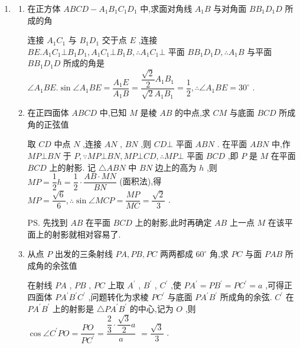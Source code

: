 \begin{enumerate}
\begin{jieda}
        在直角三角形 $\bigtriangleup {B}_{1}{OM}$ 中,易得 $\tan \angle {B}_{1}{OM} = \dfrac{{B}_{1}M}{OM} = \sqrt{2}$,所以 $\angle {B}_{1}{OM} = \arctan \sqrt{2}$. 即直线 ${B}_{1}D$ 与平面 ${AB}{C}_{1}{D}_{1}$ 所成角的大小为  $\arctan\sqrt{2}$.
    \end{jieda}
    \item \begin{enumerate}
        \item 在正方体 ${ABCD} - {A}_{1}{B}_{1}{C}_{1}{D}_{1}$ 中,求面对角线 ${A}_{1}B$ 与对角面 $B{B}_{1}{D}_{1}D$ 所成的角
        \begin{jieda}
            连接 ${A}_{1}{C}_{1}$ 与 ${B}_{1}{D}_{1}$ 交于点 $E$ ,连接 ${BE}.{A}_{1}{C}_{1} \bot  {B}_{1}{D}_{1},{A}_{1}{C}_{1} \bot  {B}_{1}B,\therefore {A}_{1}{C}_{1} \bot$ 平面 $B{B}_{1}{D}_{1}D,\therefore {A}_{1}B$ 与平面 $B{B}_{1}{D}_{1}D$ 所成的角是 $\angle {A}_{1}{BE}.\sin \angle {A}_{1}{BE} = \dfrac{{A}_{1}E}{{A}_{1}B} = \dfrac{\dfrac{\sqrt{2}}{2}{A}_{1}{B}_{1}}{\sqrt{2}{A}_{1}{B}_{1}} = \dfrac{1}{2},\therefore \angle {A}_{1}{BE} = {30}^{ \circ  }$ .
        \end{jieda}
        \item 在正四面体 ${ABCD}$ 中,已知 $M$ 是棱 ${AB}$ 的中点,求 ${CM}$ 与底面 ${BCD}$ 所成角的正弦值
        \begin{jieda}
            取 ${CD}$ 中点 $N$ ,连接 ${AN}$ , ${BN}$ ,则 ${CD} \bot$ 平面 ${ABN}$ . 在平面 ${ABN}$ 中,作 ${MP}\bot {BN}$ 于 $P,\because {MP} \bot  {BN},{MP} \bot  {CD},\therefore {MP} \bot$ 平面 ${BCD}$ ,即 $P$ 是 $M$ 在平面 ${BCD}$ 上的射影. 记 $\bigtriangleup {ABN}$ 中 ${BN}$ 边上的高为 $h$ ,则 ${MP} = \dfrac{1}{2}h = \dfrac{1}{2} \cdot  \dfrac{{AB} \cdot  {MN}}{BN}$ (面积法),得 ${MP} = \dfrac{\sqrt{6}}{6},\therefore \sin \angle {MCP} = \dfrac{MP}{MC} = \dfrac{\sqrt{2}}{3}$ . 
            
            \ps 先找到 ${AB}$ 在平面 ${BCD}$ 上的射影,此时再确定 ${AB}$ 上一点 $M$ 在该平面上的射影就相对容易了.
        \end{jieda}
        \item 从点 $P$ 出发的三条射线 ${PA},{PB},{PC}$ 两两都成 ${60}^{ \circ  }$ 角,求 ${PC}$ 与面 ${PAB}$ 所成角的余弦值
        \begin{jieda}
            在射线 ${PA}$ , ${PB}$ , ${PC}$ 上取 ${A}^{\prime }$ , ${B}^{\prime }$ , ${C}^{\prime }$ ,使 $P{A}^{\prime } = P{B}^{\prime } = P{C}^{\prime } = a$ ,可得正四面体 $P{A}^{\prime }{B}^{\prime }{C}^{\prime }$ ,问题转化为求棱 $P{C}^{\prime }$ 与底面 $P{A}^{\prime }{B}^{\prime }$ 所成角的余弦. ${C}^{\prime }$ 在 $P{A}^{\prime }{B}^{\prime }$ 上的射影是 $\bigtriangleup P{A}^{\prime }{B}^{\prime }$ 的中心,记为 $O$ ,则 $\cos \angle {C}^{\prime }{PO} = \dfrac{PO}{P{C}^{\prime }} = \dfrac{\dfrac{2}{3} \cdot  \dfrac{\sqrt{3}}{2}a}{a}$  $= \dfrac{\sqrt{3}}{3}$ .
        \end{jieda}
    \end{enumerate}


\end{enumerate}
